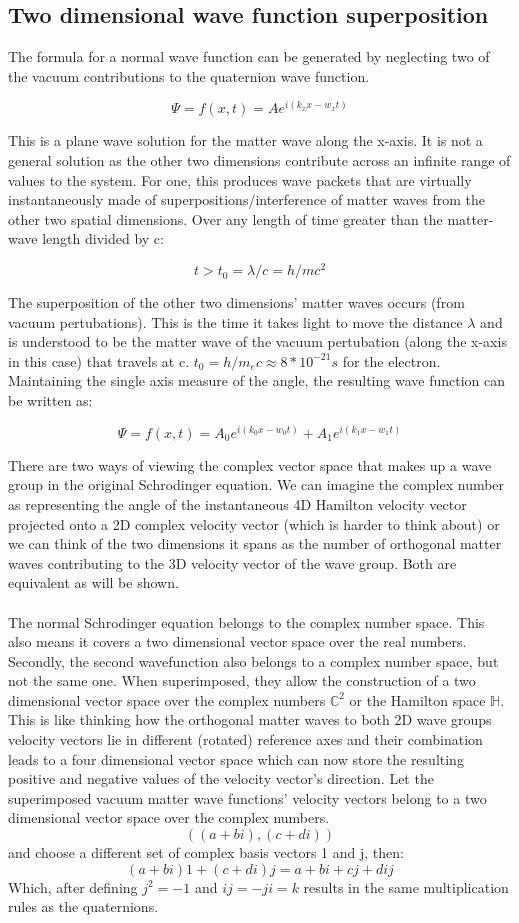 \documentclass{article}
\begin{document}
\subsection{Two dimensional wave function superposition}

The formula for a normal wave function can be generated by neglecting two of the vacuum contributions to the quaternion wave function.

$$\Psi=f(x,t)=A e^{i(k_x x-w_x t)}$$

This is a plane wave solution for the matter wave along the x-axis. It is not a general solution as the other two dimensions contribute across an infinite range of values to the system. For one, this produces wave packets that are virtually instantaneously made of superpositions/interference of matter waves from the other two spatial dimensions. Over any length of time greater than the matter-wave length divided by c: 

$$t>t_0=\lambda /c=h/mc^2$$

The superposition of the other two dimensions' matter waves occurs (from vacuum pertubations). This is the time it takes light to move the distance $\lambda$ and is understood to be the matter wave of the vacuum pertubation (along the x-axis in this case) that travels at c.  $t_0=h/m_e c \approx 8*10^{-21}s$ for the electron. Maintaining the single axis measure of the angle, the resulting wave function can be written as:

$$\Psi=f(x,t)=A_0 e^{i(k_0 x-w_0 t)}+A_1e^{i(k_1 x-w_1 t)}$$

There are two ways of viewing the complex vector space that makes up a wave group in the original Schrodinger equation. We can imagine the complex number as representing the angle of the instantaneous 4D Hamilton velocity vector projected onto a 2D complex velocity vector (which is harder to think about) or we can think of the two dimensions it spans as the number of orthogonal matter waves contributing to the 3D velocity vector of the wave group. Both are equivalent as will be shown.\\ 
\\
The normal Schrodinger equation belongs to the complex number space. This also means it covers a two dimensional vector space over the real numbers. Secondly, the second wavefunction also belongs to a complex number space, but not the same one. When superimposed, they  allow the construction of a two dimensional vector space over the complex numbers $\mathbb{C}^2$ or the Hamilton space $\mathbb{H}$. This is like thinking how the orthogonal matter waves to both 2D wave groups velocity vectors lie in different (rotated) reference axes and their combination leads to a four dimensional vector space which can now store the resulting positive and negative values of the velocity vector's direction. Let the superimposed vacuum matter wave functions' velocity vectors belong to a two dimensional vector space over the complex numbers.
$$((a+bi),(c+di))$$
and choose a different set of complex basis vectors 1 and j, then:
$$(a+bi)1+(c+di)j = a+bi+cj+dij$$
Which, after defining $j^2=-1$ and $ij=-ji=k$ results in the same multiplication rules as the quaternions.\\
\end{document}
